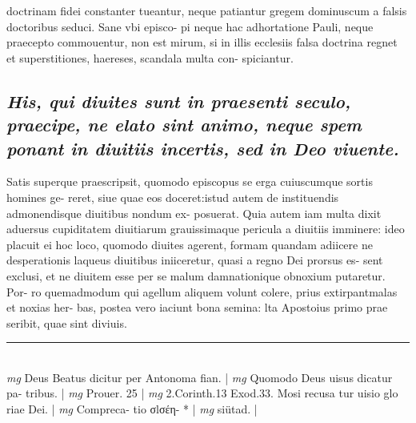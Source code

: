 \documentclass{article}
\begin{document}
\begin{pages}
doctrinam fidei constanter tueantur, neque patiantur gregem dominuscum a falsis doctoribus seduci. Sane vbi episco- pi neque hac adhortatione Pauli, neque praecepto commouentur, non est mirum, si in illis ecclesiis falsa doctrina regnet et superstitiones, haereses, scandala multa con- spiciantur.  \pend
{}
{}
\subsection*{\textit{His, qui diuites sunt in praesenti seculo, praecipe, ne elato sint animo, neque spem ponant in diuitiis incertis, sed in Deo viuente. }}\pstart Satis superque praescripsit, quomodo episcopus se erga cuiuscumque sortis homines ge- reret, siue quae eos doceret:istud autem de instituendis admonendisque diuitibus nondum ex- posuerat. Quia autem iam multa dixit aduersus cupiditatem diuitiarum grauissimaque pericula a diuitiis imminere: ideo placuit ei hoc loco, quomodo diuites agerent, formam quandam adiicere ne desperationis laqueus diuitibus iniiceretur, quasi a regno Dei prorsus es- sent exclusi, et ne diuitem esse per se malum damnationique obnoxium putaretur. Por- ro quemadmodum qui agellum aliquem volunt colere, prius extirpantmalas et noxias her- bas, postea vero iaciunt bona semina: lta Apostoius primo prae seribit, quae sint diviuis.  \pend
\vspace{0.5cm}\noindent
\vspace{0.2cm}\rule{1cm}{0.2pt}\\ 
\hspace{0.2cm}\textit{mg}
\footnotesize Deus Beatus dicitur per Antonoma fian. 
\normalsize| 
\hspace{0.2cm}\textit{mg}
\footnotesize Quomodo Deus uisus dicatur pa- tribus. 
\normalsize| 
\hspace{0.2cm}\textit{mg}
\footnotesize Prouer. 25 
\normalsize| 
\hspace{0.2cm}\textit{mg}
\footnotesize 2.Corinth.13 Exod.33. Mosi recusa tur uisio glo riae Dei. 
\normalsize| 
\hspace{0.2cm}\textit{mg}
\footnotesize Compreca- tio σlσέη- * 
\normalsize| 
\hspace{0.2cm}\textit{mg}
\footnotesize siütad. 
\normalsize| 

\end{pages}
\end{document}
